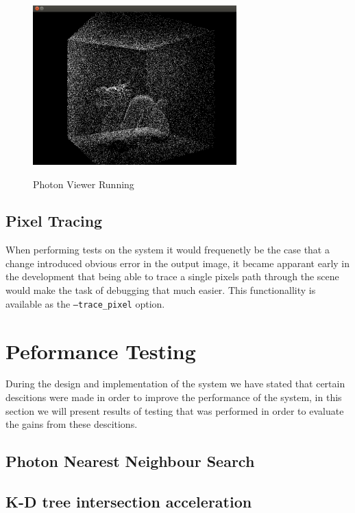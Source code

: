 \begin{figure}
\centering
\includegraphics[width=0.7\textwidth]{./images/photon_viewer.png}
\label{fig:photon_viewer}
\caption{Photon Viewer Running}
\end{figure}

\subsection{Pixel Tracing}
When performing tests on the system it would frequenetly be the case that a change introduced obvious error in the output image,
it became apparant early in the development that being able to trace a single pixels path through the scene would make the
task of debugging that much easier. This functionallity is available as the \texttt{--trace\_pixel} option.

\section{Peformance Testing}
During the design and implementation of the system we have stated that certain descitions were made in order to improve the performance
of the system, in this section we will present results of testing that was performed in order to evaluate the gains from these descitions.

\subsection{Photon Nearest Neighbour Search}

\subsection{K-D tree intersection acceleration}

